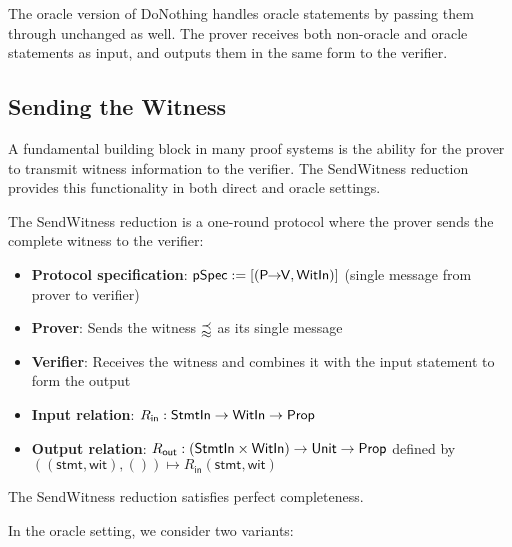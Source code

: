 The oracle version of DoNothing handles oracle statements by passing them through unchanged as well. The prover receives both non-oracle and oracle statements as input, and outputs them in the same form to the verifier.

\subsection{Sending the Witness}

A fundamental building block in many proof systems is the ability for the prover to transmit witness information to the verifier. The SendWitness reduction provides this functionality in both direct and oracle settings.

\begin{definition}
    \label{def:sendwitness_reduction}
    The SendWitness reduction is a one-round protocol where the prover sends the complete witness to the verifier:
    \begin{itemize}
        \item \textbf{Protocol specification}: $\pSpec := [(\PtoVdir, \WitIn)]$ (single message from prover to verifier)
        \item \textbf{Prover}: Sends the witness $\mathbbm{w}$ as its single message
        \item \textbf{Verifier}: Receives the witness and combines it with the input statement to form the output
        \item \textbf{Input relation}: $R_{\mathsf{in}} : \StmtIn \to \WitIn \to \Prop$
        \item \textbf{Output relation}: $R_{\mathsf{out}} : (\StmtIn \times \WitIn) \to \Unit \to \Prop$ defined by $((\mathsf{stmt}, \mathsf{wit}), ()) \mapsto R_{\mathsf{in}}(\mathsf{stmt}, \mathsf{wit})$
    \end{itemize}
\end{definition}

\begin{theorem}
    The SendWitness reduction satisfies perfect completeness.
\end{theorem}

In the oracle setting, we consider two variants:


